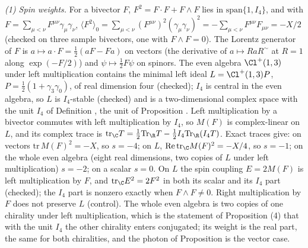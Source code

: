\emph{(1) Spin weights.} For a bivector $F$, $F^{2} = F\cdot F + F\wedge F$ lies in $\mathrm{span}\{1, I_{4}\}$, and with $F = \sum_{\mu<\nu}F^{\mu\nu}\gamma_{\mu}\gamma_{\nu}$, $\langle F^{2}\rangle_{0} = \sum_{\mu<\nu}(F^{\mu\nu})^{2}(\gamma_{\mu}\gamma_{\nu})^{2} = -\sum_{\mu<\nu}F^{\mu\nu}F_{\mu\nu} = -X/2$ (checked on three sample bivectors, one with $F\wedge F = 0$). The Lorentz generator of $F$ is $a \mapsto a\cdot F = \tfrac12(aF - Fa)$ on vectors (the derivative of $a \mapsto RaR^{\sim}$ at $R = 1$ along $\exp(-F/2)$) and $\psi \mapsto \tfrac12F\psi$ on spinors. The even algebra $\Cl^{+}(1,3)$ under left multiplication contains the minimal left ideal $L = \Cl^{+}(1,3)P$, $P = \tfrac12(1 + \gamma_{3}\gamma_{0})$, of real dimension four (checked); $I_{4}$ is central in the even algebra, so $L$ is $I_{4}$-stable (checked) and is a two-dimensional complex space with the unit $I_{4}$ of Definition , the unit of Proposition . Left multiplication by a bivector commutes with left multiplication by $I_{4}$, so $M(F)$ is complex-linear on $L$, and its complex trace is $\mathrm{tr}_{\C}T = \tfrac12\mathrm{Tr}_{\R}T - \tfrac12I_{4}\mathrm{Tr}_{\R}(I_{4}T)$. Exact traces give: on vectors $\mathrm{tr}\,M(F)^{2} = -X$, so $s = -4$; on $L$, $\mathrm{Re}\,\mathrm{tr}_{\C}M(F)^{2} = -X/4$, so $s = -1$; on the whole even algebra (eight real dimensions, two copies of $L$ under left multiplication) $s = -2$; on a scalar $s = 0$. On $L$ the spin coupling $E = 2M(F)$ is left multiplication by $F$, and $\mathrm{tr}_{\C}E^{2} = 2F^{2}$ in both its scalar and its $I_{4}$ part (checked); the $I_{4}$ part is nonzero exactly when $F\wedge F \neq 0$. Right multiplication by $F$ does not preserve $L$ (control). The whole even algebra is two copies of one chirality under left multiplication, which is the statement of Proposition (4) that with the unit $I_{4}$ the other chirality enters conjugated; its weight is the real part, the same for both chiralities, and the photon of Proposition  is the vector case.

